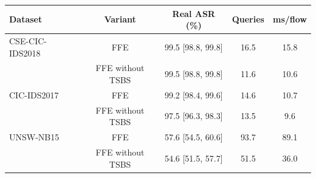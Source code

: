 \begin{tabular}{@{}lcccc@{}}
\toprule
\textbf{Dataset} & \textbf{Variant} & \textbf{Real ASR (\%)} & \textbf{Queries} & \textbf{ms/flow} \\
\midrule
CSE-CIC-IDS2018 & FFE & 99.5 [98.8, 99.8] & 16.5 & 15.8 \\
 & FFE without TSBS & 99.5 [98.8, 99.8] & 11.6 & 10.6 \\
CIC-IDS2017 & FFE & 99.2 [98.4, 99.6] & 14.6 & 10.7 \\
 & FFE without TSBS & 97.5 [96.3, 98.3] & 13.5 & 9.6 \\
UNSW-NB15 & FFE & 57.6 [54.5, 60.6] & 93.7 & 89.1 \\
 & FFE without TSBS & 54.6 [51.5, 57.7] & 51.5 & 36.0 \\
\bottomrule
\end{tabular}
